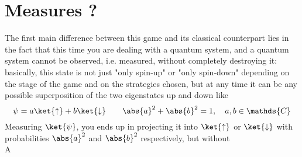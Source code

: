 \hfill

\section{Measures ?}

The first main difference between this game and its classical counterpart lies in the fact that this time you are dealing with a quantum system, and a quantum system cannot be observed, i.e. measured, without completely destroying it: basically, this state is not just "only spin-up" or "only spin-down" depending on the stage of the game and on the strategies chosen, but at any time it can be any possible superposition of the two eigenstates up and down like
\[ \psi = a\ket{\uparrow} + b\ket{\downarrow} \qquad \abs{a}^2 + \abs{b}^2 = 1, \quad a,b\in\mathds{C}\]
Measuring $\ket{\psi}$, you ends up in projecting it into $\ket{\uparrow}$ or $\ket{\downarrow}$
with probabilities $\abs{a}^2$ and $\abs{b}^2$ respectively, but without \\

A 

